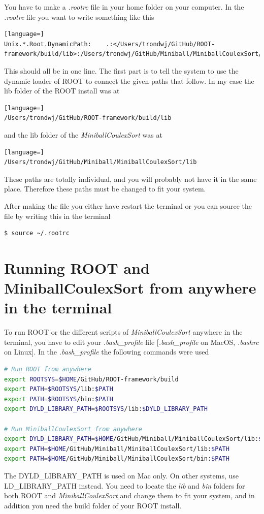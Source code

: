 \documentclass[twoside,english]{uiofysmaster/uiofysmaster}
\begin{document}
\begin{appendices}
You have to make a \textit{.rootrc} file in your home folder on your computer. In the \textit{.rootrc} file you want to write something like this 
\begin{lstlisting}[language=]
Unix.*.Root.DynamicPath:    .:</Users/trondwj/GitHub/ROOT-framework/build/lib>:/Users/trondwj/GitHub/Miniball/MiniballCoulexSort/lib:
\end{lstlisting}
This should all be in one line. The first part is to tell the system to use the dynamic loader of ROOT to connect the given paths that follow. In my case the lib folder of the ROOT install was at 
\begin{lstlisting}[language=]
/Users/trondwj/GitHub/ROOT-framework/build/lib
\end{lstlisting}
and the lib folder of the \textsl{MiniballCoulexSort} was at
\begin{lstlisting}[language=]
/Users/trondwj/GitHub/Miniball/MiniballCoulexSort/lib
\end{lstlisting}
These paths are totally individual, and you will probably not have it in the same place. Therefore these paths must be changed to fit your system. 

After making the file you either have restart the terminal or you can source the file by writing this in the terminal
\begin{lstlisting}[language=sh]
$ source ~/.rootrc
\end{lstlisting}



\section{Running ROOT and MiniballCoulexSort from anywhere in the terminal}
To run ROOT or the different scripts of \textsl{MiniballCoulexSort} anywhere in the terminal, you have to edit your \textit{.bash\_profile} file [\textit{.bash\_profile} on MacOS, \textit{.bashrc} on Linux]. In the \textit{.bash\_profile} the following commands were used 
\begin{lstlisting}[language=sh]
# Run ROOT from anywhere
export ROOTSYS=$HOME/GitHub/ROOT-framework/build
export PATH=$ROOTSYS/lib:$PATH
export PATH=$ROOTSYS/bin:$PATH
export DYLD_LIBRARY_PATH=$ROOTSYS/lib:$DYLD_LIBRARY_PATH

# Run MiniballCoulexSort from anywhere
export DYLD_LIBRARY_PATH=$HOME/GitHub/Miniball/MiniballCoulexSort/lib:$DYLD_LIBRARY_PATH
export PATH=$HOME/GitHub/Miniball/MiniballCoulexSort/lib:$PATH
export PATH=$HOME/GitHub/Miniball/MiniballCoulexSort/bin:$PATH
\end{lstlisting}
The DYLD\_LIBRARY\_PATH is used on Mac only. On other systems, use \newline LD\_LIBRARY\_PATH instead. You need to locate the \textit{lib} and \textit{bin} folders for both ROOT and \textsl{MiniballCoulexSort} and change them to fit your system, and in addition you need the build folder of your ROOT install.



\end{appendices}
\end{document}
